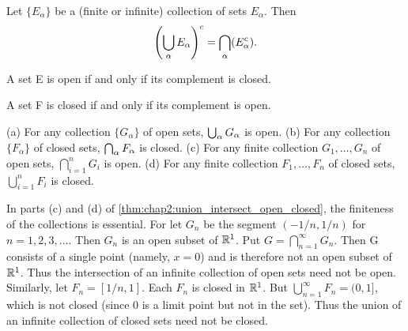 

\begin{theorem} %
  \label{thm:chap2:de_morgan_complements}
  Let $\{E_\alpha\}$ be a (finite or infinite) collection of sets
  $E_\alpha$. Then
  \begin{equation} \label{eq:chap2:de_morgan}
    \left( \bigcup_{\alpha} E_\alpha \right)^c =
    \bigcap_{\alpha} (E_\alpha^c).
  \end{equation}
\end{theorem}

\begin{theorem} %
  \label{thm:chap2:open_iff_complement_closed}
  A set E is open if and only if its complement is closed.
\end{theorem}

\begin{corollary} %
  \label{cor:chap2:closed_iff_complement_open}
  A set F is closed if and only if its complement is open.
\end{corollary}

\begin{theorem} %
  \label{thm:chap2:union_intersect_open_closed}
  (a) For any collection $\{G_\alpha\}$ of open sets,
  $\bigcup_{\alpha} G_\alpha$ is open. \label{thm:chap2:union_open}
  (b) For any collection $\{F_\alpha\}$ of closed sets,
  $\bigcap_{\alpha} F_\alpha$ is closed. \label{thm:chap2:intersect_closed}
  (c) For any finite collection $G_1, \dots, G_n$ of open sets,
  $\bigcap_{i=1}^n G_i$ is open. \label{thm:chap2:finite_intersect_open}
  (d) For any finite collection $F_1, \dots, F_n$ of closed sets,
  $\bigcup_{i=1}^n F_i$ is closed. \label{thm:chap2:finite_union_closed}
\end{theorem}

\begin{example} %
  \label{ex:chap2:infinite_intersect_union_counterex}
  In parts (c) and (d) of
  \autoref{thm:chap2:union_intersect_open_closed}, the finiteness of
  the collections is essential. For let $G_n$ be the segment $(-1/n,
  1/n)$ for $n=1, 2, 3, \dots$. Then $G_n$ is an open subset of
  $\mathbb{R}^1$. Put $G = \bigcap_{n=1}^\infty G_n$. Then G consists of a
  single point (namely, $x=0$) and is therefore not an open subset of
  $\mathbb{R}^1$. Thus the intersection of an infinite collection of open
  sets need not be open.
  Similarly, let $F_n = [1/n, 1]$. Each $F_n$ is closed in $\mathbb{R}^1$.
  But $\bigcup_{n=1}^\infty F_n = (0, 1]$, which is not closed (since
  0 is a limit point but not in the set). Thus the union of an
  infinite collection of closed sets need not be closed.
\end{example}

